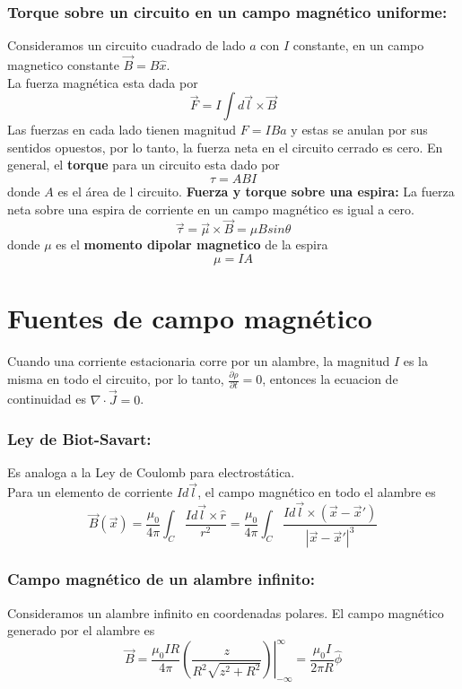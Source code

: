 \documentclass[a4paper, 10pt]{article}
\begin{document}
\begin{multicols*}{2}
	\subsubsection{Torque sobre un circuito en un campo magnético uniforme: }Consideramos un circuito cuadrado de lado $a$ con $I$ constante, en un campo magnetico constante $\vec{B}=B\hat{x}$.\\
	La fuerza magnética esta dada por
	$$\vec{F}=I\int d\vec{l}\times \vec{B}$$
	Las fuerzas en cada lado tienen magnitud $F=IBa$ y estas se anulan por sus sentidos opuestos, por lo tanto, la fuerza neta en el circuito cerrado es cero. 
	En general, el \textbf{torque} para un circuito esta dado por
	$$\tau=ABI$$
	donde $A$ es el área de l circuito.
	\textbf{Fuerza y torque sobre una espira: }La fuerza neta sobre una espira de corriente en un campo magnético es igual a cero.
	$$\vec{\tau} = \vec{\mu}\times\vec{B} = \mu B sin \theta $$
	donde $\mu$ es el \textbf{momento dipolar magnetico} de la espira 
	$$\mu =IA$$
	    
	\section{Fuentes de campo magnético}
	Cuando una corriente estacionaria corre por un alambre,
  la magnitud $I$ es la misma en todo el circuito,
  por lo tanto, $\frac{\partial \rho}{\partial t}=0$,
  entonces la ecuacion de continuidad es $\nabla \cdot \vec{J}=0$.\\
	    
	\subsubsection{Ley de Biot-Savart: }Es analoga a la Ley de Coulomb para electrostática.\\
	Para un elemento de corriente $Id\vec{l}$, el campo magnético en todo el alambre es
	$$\vec{B}(\vec{x})=\frac{\mu _0}{4\pi}\int_C \frac{Id\vec{l}\times \hat{r}}{r^2}=\frac{\mu _0}{4\pi}\int_C \frac{Id\vec{l}\times (\vec{x}-\vec{x}')}{|\vec{x}-\vec{x}'|^3}$$
	    
	\subsubsection{Campo magnético de un alambre infinito:} Consideramos un alambre infinito en coordenadas polares. El campo magnético generado por el alambre es
	$$\vec{B}= \left.\frac{\mu_0 IR}{4\pi}\left(\frac{z}{R^2\sqrt{z^2+R^2}}\right)\right| _{-\infty}^{\infty}=\frac{\mu_0I}{2\pi R}\hat{\phi}$$
	    

\end{multicols*}
\end{document}
